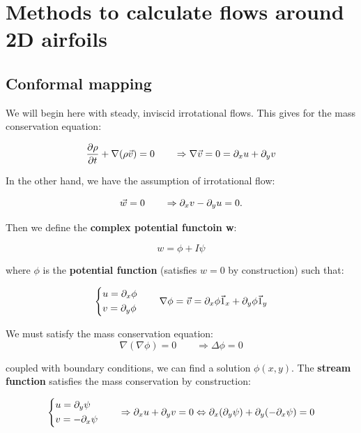\section{Methods to calculate flows around 2D airfoils}
	\subsection{Conformal mapping}
		We will begin here with steady, inviscid irrotational flows. This gives for the mass conservation equation:
		
		\begin{equation}
		\frac{\D \rho}{\D t} + \nabla (\rho \vec{v}) = 0 \qquad \Rightarrow \nabla \vec{v} = 0 = \D _x u + \D _y v
		\end{equation}
		
		In the other hand, we have the assumption of irrotational flow:
		
		\begin{equation}
		\vec{w} = 0 \qquad \Rightarrow \D _x v - \D _y u = 0.
		\end{equation}
		
		Then we define the \textbf{complex potential functoin w}:
		
		\begin{equation}
		w = \phi + I\psi
		\end{equation}		 
		
		where $\phi$ is the \textbf{potential function} (satisfies $w=0$ by construction) such that:
		
		\begin{equation}
		\left\{
		\begin{aligned}
		&u = \D _x \phi \\
		&v = \D _y \phi
		\end{aligned}
		\right.
		\qquad
		\nabla \phi = \vec{v} = \D _x\phi \vec{1} _x + \D _y \phi \vec{1}_y
		\end{equation}
		
		We must satisfy the mass conservation equation:
		\begin{equation}
		\nabla (\nabla \phi) = 0 \qquad \Rightarrow \Delta \phi = 0 
 		\end{equation}
 		
 		coupled with boundary conditions, we can find a solution $\phi (x,y)$. The \textbf{stream function} satisfies the mass conservation by construction:
 		
 		\begin{equation}
 		\left\{ 
 		\begin{aligned}
 		&u = \D _y \psi\\
 		&v = - \D _x \psi
 		\end{aligned}
 		\right.
 		\qquad \Rightarrow \D _x u + \D _y v = 0 \Leftrightarrow \D _x (\D _y \psi) + \D _y (- \D _x \psi) = 0
 		\end{equation}
 		
